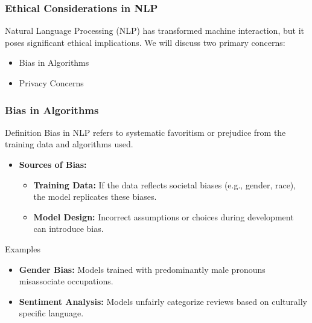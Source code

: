 \documentclass[aspectratio=169]{beamer}
\begin{document}
\begin{frame}[fragile]
    \frametitle{Ethical Considerations in NLP}
    Natural Language Processing (NLP) has transformed machine interaction, but it poses significant ethical implications. 
    We will discuss two primary concerns:
    \begin{itemize}
        \item Bias in Algorithms
        \item Privacy Concerns
    \end{itemize}
\end{frame}

\begin{frame}[fragile]
    \frametitle{Bias in Algorithms}
    \begin{block}{Definition}
        Bias in NLP refers to systematic favoritism or prejudice from the training data and algorithms used.
    \end{block}
    
    \begin{itemize}
        \item \textbf{Sources of Bias:}
        \begin{itemize}
            \item \textbf{Training Data:} If the data reflects societal biases (e.g., gender, race), the model replicates these biases.
            \item \textbf{Model Design:} Incorrect assumptions or choices during development can introduce bias.
        \end{itemize}
    \end{itemize}
    
    \begin{block}{Examples}
        \begin{itemize}
            \item \textbf{Gender Bias:} Models trained with predominantly male pronouns misassociate occupations.
            \item \textbf{Sentiment Analysis:} Models unfairly categorize reviews based on culturally specific language.
        \end{itemize}
    \end{block}
\end{frame}
\end{document}
